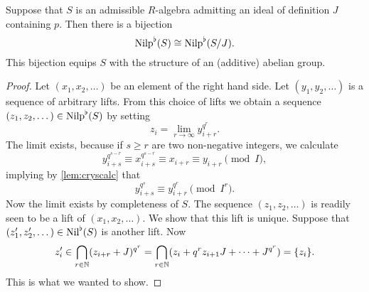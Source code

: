 \begin{lem} \label{lem:crysnilp}
  Suppose that $S$ is an admissible $R$-algebra admitting an ideal of
  definition $J$ containing $p$. Then there is a bijection
  \begin{equation*}
    {\mathrm{Nilp}}^\flat(S) \cong {\mathrm{Nilp}}^\flat(S/J).
  \end{equation*}
  This bijection equips $S$ with the structure of an (additive) abelian group. 
  \begin{proof}[Proof]
    Let $(x_1, x_2, \dots)$ be an element of the right hand side. Let
    $(y_1, y_2, \dots)$ is a sequence of arbitrary lifts. From this choice of lifts
    we obtain a sequence
    $(z_1, z_2, \dots) \in {\mathrm{Nilp}}^\flat(S)$ by setting
    \begin{equation*}
      z_i = \lim_{r \to \infty} y_{i+r}^{q^r}.
    \end{equation*}
    The limit exists, because if $s \geq r$ are two non-negative integers, we calculate
    \begin{equation*}
      y_{i + s}^{q^{s-r}} \equiv x_{i+s}^{q^{s-r}} \equiv x_{i+r} \equiv y_{i+r} \pmod I,
    \end{equation*}
    implying by \ref{lem:cryscalc} that 
    \begin{equation*}
      y_{i+s}^{q^s} \equiv y_{i+r}^{q^r} \pmod {I^r}.
    \end{equation*}
    Now the limit exists by completeness of $S$.
    The sequence $(z_1, z_2, \dots)$  is readily seen to be a lift of 
    $(x_1, x_2, \dots)$. We show that this lift is unique. Suppose that 
    $(z'_1, z'_2, \dots) \in {\operatorname{Nil}}^\flat(S)$ is another lift. Now 
    \begin{equation*}
      z'_i \in \bigcap_{r \in \mathbb{N}}(z_{i+r} + J)^{q^r} = \bigcap_{r \in \mathbb{N}}(z_{i} +
      q^r z_{i+1} J + \dots + J^{q^r})=  \{z_i\}.
    \end{equation*}
    This is what we wanted to show.
  \end{proof}
\end{lem}

